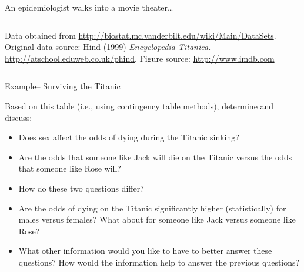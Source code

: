 \documentclass[ignorenonframetext,]{beamer}
\providecommand{\tightlist}{%
  \setlength{\itemsep}{0pt}\setlength{\parskip}{0pt}}
\begin{document}
\begin{frame}{An epidemiologist walks into a movie theater\ldots{}}
\begin{columns}
\begin{column}{0.55\textwidth}
\medskip

\justifying

\footnotesize{Data obtained from \url{http://biostat.mc.vanderbilt.edu/wiki/Main/DataSets}. Original data source: Hind (1999) \textit{Encyclopedia Titanica.} \url{http://atschool.eduweb.co.uk/phind}. Figure source: \url{http://www.imdb.com}}
\end{column}
\end{columns}

\end{frame}

\begin{frame}{Example-- Surviving the Titanic}

Based on this table (i.e., using contingency table methods), determine
and discuss:

\begin{itemize}
\tightlist
\item
  Does sex affect the odds of dying during the Titanic sinking?
\item
  Are the odds that someone like Jack will die on the Titanic versus the
  odds that someone like Rose will?
\item
  How do these two questions differ?
\item
  Are the odds of dying on the Titanic significantly higher
  (statistically) for males versus females? What about for someone like
  Jack versus someone like Rose?
\item
  What other information would you like to have to better answer these
  questions? How would the information help to answer the previous
  questions?
\end{itemize}

\end{frame}
\end{document}

